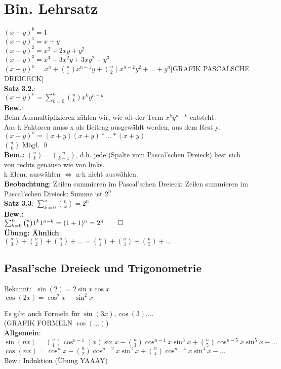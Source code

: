 \section{Bin. Lehrsatz}
$(x+y)^0=1$\\
$(x+y)^1 = x+y$\\
$(x+y)^2 = x^2+2xy+y^2$\\
$(x+y)^3= x^3+3x^2y+3xy^2+y^3$\medskip\\
$(x+y)^n=x^n+\binom{n}{1}x^{n-1}y+\binom{n}{2}x^{n-2}y^2+...+y^n$[GRAFIK PASCALSCHE DREICECK]\medskip\\ 
\textbf{Satz 3.2.}:\\
$(x+y)^n =\sum^n_{k=0} \binom{n}{k}x^ky^{n-k}$\medskip\\
\textbf{Bew.}: \\
Beim Ausmultiplizieren zählen wir, wie oft der Term $x^ky^{n-k}$ entsteht.\\
Aus k Faktoren muss x als Beitrag ausgewählt werden, aus dem Rest y.
$(x+y)^n=(x+y)(x+y)*...*(x+y)$\\
$\binom{n}{k}$ Mögl. \qed\medskip\\
\textbf{Bem.:} $\binom{n}{k}=\binom{n}{k-1}$, d.h. jede (Spalte vom Pascal'schen Dreieck) liest sich von rechts genauso wie von links.\\
k Elem. auswählen $\Leftrightarrow$ n-k nicht auswählen.\\
 \textbf{Beobachtung}: Zeilen summieren im Pascal'schen Dreieck: Zeilen summieren im Pascal'schen Dreieck: Summe ist $2^n$\medskip\\
 \textbf{Satz 3.3}: $\sum^n_{k=0} \binom{n}{k} = 2^n$\\
 \textbf{Bew.:}\\
 $\sum^n_{k=0}\binom{n}{k}1^k1^{n-k} = (1+1)^n=2^n\qed$\\
 \textbf{Übung: Ähnlich}:\\
 $\binom{n}{0}+\binom{n}{2}+\binom{n}{4}+...=\binom{n}{1}+\binom{n}{3}+\binom{n}{5}+...$\medskip\\
\subsection{ Pasal'sche Dreieck und Trigonometrie}
\begin{tabbing}
	Bekannt: \= $\sin(2) = 2\sin x \cos x$\\
	\> $\cos(2x)=\cos^2x-\sin^2x$
\end{tabbing}
Es gibt auch Formeln für $\sin(3x) , \cos(3)$,...\medskip\\
(GRAFIK FORMELN $\cos(...)$)\\
\textbf{Allgemein}:\\
$\sin(nx) = \binom{n}{1}\cos^{n-1}(x) \sin x - \binom{n}{3}\cos^{n-1}x \sin^3x + \binom{n}{5} \cos^{n-5}x \sin^5x-...$\medskip\\
$\cos(nx) = \cos^nx - \binom{n}{2}\cos^{n-2}x\sin^2x+\binom{n}{4}\cos^{n-4}x\sin^4x-...$\medskip\\
Bew.: Induktion (Übung YAAAY)
